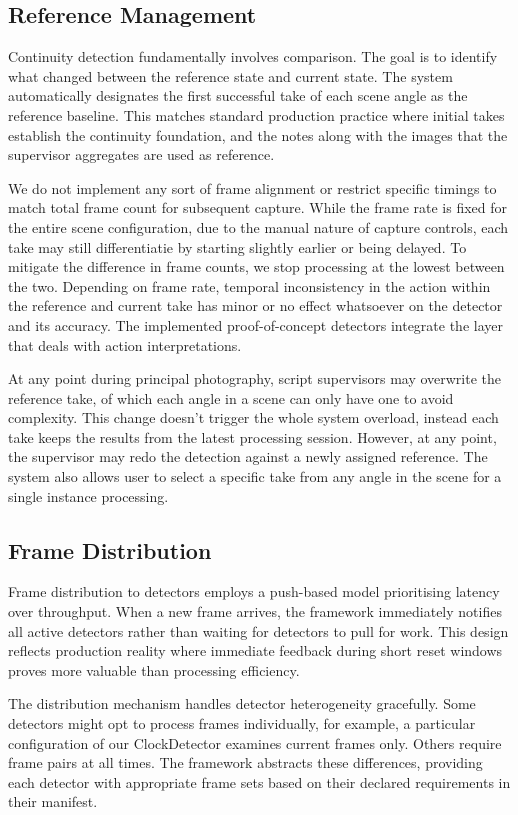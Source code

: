 \subsection{Reference Management}
Continuity detection fundamentally involves comparison. The goal is to identify what changed between the reference state and current state. The system automatically designates the first successful take of each scene angle as the reference baseline. This matches standard production practice where initial takes establish the continuity foundation, and the notes along with the images that the supervisor aggregates are used as reference.

We do not implement any sort of frame alignment or restrict specific timings to match total frame count for subsequent capture. While the frame rate is fixed for the entire scene configuration, due to the manual nature of capture controls, each take may still differentiatie by starting slightly earlier or being delayed. To mitigate the difference in frame counts, we stop processing at the lowest between the two. Depending on frame rate, temporal inconsistency in the action within the reference and current take has minor or no effect whatsoever on the detector and its accuracy. The implemented proof-of-concept detectors integrate the layer that deals with action interpretations.

At any point during principal photography, script supervisors may overwrite the reference take, of which each angle in a scene can only have one to avoid complexity. This change doesn't trigger the whole system overload, instead each take keeps the results from the latest processing session. However, at any point, the supervisor may redo the detection against a newly assigned reference. The system also allows user to select a specific take from any angle in the scene for a single instance processing.

\subsection{Frame Distribution}
Frame distribution to detectors employs a push-based model prioritising latency over throughput. When a new frame arrives, the framework immediately notifies all active detectors rather than waiting for detectors to pull for work. This design reflects production reality where immediate feedback during short reset windows proves more valuable than processing efficiency.

The distribution mechanism handles detector heterogeneity gracefully. Some detectors might opt to process frames individually, for example, a particular configuration of our ClockDetector examines current frames only. Others require frame pairs at all times. The framework abstracts these differences, providing each detector with appropriate frame sets based on their declared requirements in their manifest.

